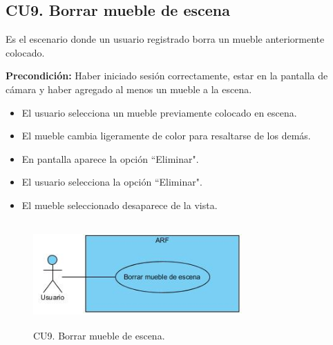 \subsection{CU9. Borrar mueble de escena}\par
Es el escenario donde un usuario registrado borra un mueble anteriormente colocado.\par
\textbf{Precondición:} Haber iniciado sesión correctamente, estar en la pantalla de cámara y haber agregado al menos un mueble a la escena.\par
\begin{itemize}
	\item El usuario selecciona un mueble previamente colocado en escena.
	\item El mueble cambia ligeramente de color para resaltarse de los demás.
	\item En pantalla aparece la opción ``Eliminar".
	\item El usuario selecciona la opción ``Eliminar".
	\item El mueble seleccionado desaparece de la vista.
\end{itemize}

\begin{figure}[h!]
	\centering
	\includegraphics[width=8cm,height=4cm]{imagenes/analisis/cu/borrar_mueble.jpg}
	\caption{CU9. Borrar mueble de escena.}
	\label{fig:borrarmueble}
\end{figure} 



